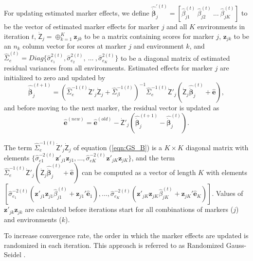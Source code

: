 \documentclass{bmcart}
\newcommand{\vecx}{\boldsymbol}
\newcommand{\mat}[1]{\boldsymbol{\mathsf{#1}}}
\begin{document}
For updating estimated marker effects, we define $\hat{\dot{\vecx{\beta}}}^{'(t)}_j = [\hat{\beta}^{(t)}_{j1}~\hat{\beta}^{(t)}_{j2}~\hdots~\hat{\beta}^{(t)}_{jK}]$ to be the vector of estimated marker effects for marker $j$ and all $K$ environments in iteration $t$, $\dot{\mat{Z}}_j = \oplus^{K}_{k=1} \vecx{z}_{jk}$ to be a matrix containing scores for marker $j$, $\vecx{z}_{jk}$ to be an $n_k$ column vector for scores at marker $j$ and environment $k$, and $\hat{\mat{\Sigma}}^{(t)}_{e} = Diag\{\hat{\sigma}^{2(t)}_{e_1},\hat{\sigma}^{2(t)}_{e_2},~\hdots~,\hat{\sigma}^{2(t)}_{e_K}\}$ to be a diagonal matrix of estimated residual variances from all environments. Estimated effects for marker $j$ are initialized to zero and updated by
\begin{equation}%
\label{eqn:GS_B}
\hat{\dot{\vecx{\beta}}}^{(t+1)}_j = (\hat{\mat{\Sigma}}^{-1(t)}_{e}\dot{\mat{Z}}'_j\dot{\mat{Z}}_j + \hat{\mat{\Sigma}}^{-1(t)}_{\beta})^{-1} \hat{\mat{\Sigma}}^{-1(t)}_{e}\dot{\mat{Z}}'_j (\dot{\mat{Z}}_j\hat{\dot{\vecx{\beta}}}^{(t)}_j+\hat{\vecx{e}}),
\end{equation}
and before moving to the next marker, the residual vector is updated as
\begin{equation}\nonumber
\label{eqn:GS_E}
\hat{\vecx{e}}^{(new)} = \hat{\vecx{e}}^{(old)} -  \dot{\mat{Z}}'_j(\hat{\dot{\vecx{\beta}}}^{(t+1)}_j - \hat{\dot{\vecx{\beta}}}^{(t)}_j).
\end{equation}

The term 
$\hat{\mat{\Sigma}}^{-1(t)}_{e}\dot{\mat{Z}}'_j\dot{\mat{Z}}_j$ of equation (\ref{eqn:GS_B}) is a $K\times K$ diagonal matrix with elements $\{\hat{\sigma}^{-2(t)}_{e1}\vecx{z}'_{j1} \vecx{z}_{j1}, ... , \hat{\sigma}^{-2(t)}_{eK}\vecx{z}'_{jK} \vecx{z}_{jK}\}$, and the term $\hat{\mat{\Sigma}}^{-1(t)}_{e}\dot{\mat{Z}}'_j(\dot{\mat{Z}}_j\hat{\dot{\vecx{\beta}}}^{(t)}_j+\hat{\vecx{e}})$ can be computed as a vector of length $K$ with elements $[ \hat{\sigma}^{-2(t)}_{e_1}(\vecx{z}'_{j1} \vecx{z}_{j1} \hat{\beta}^{(t)}_{j1} + \vecx{z}_{j1}' \hat{\vecx{e}}_1), ... , \hat{\sigma}^{-2(t)}_{e_K}(\vecx{z}'_{jK} \vecx{z}_{jK} \hat{\beta}^{(t)}_{jK} + \vecx{z}_{jK}' \hat{\vecx{e}}_K)]$. Values of $\vecx{z}'_{jk} \vecx{z}_{jk}$ are calculated before iterations start for all combinations of markers ($j$) and environments ($k$). 

To increase convergence rate, the order in which the marker effects are updated is randomized in each iteration. This approach is referred to as Randomized Gauss-Seidel \cite{LL2010,Ma2015}.
\end{document}
